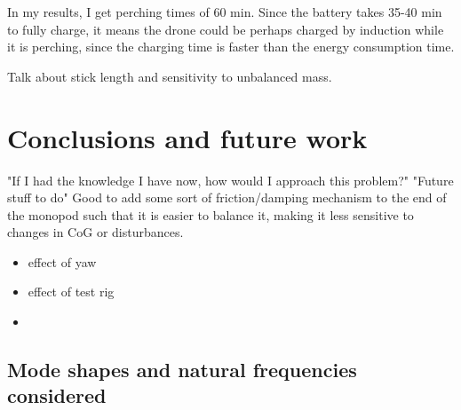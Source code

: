 \documentclass[12pt,a4paper]{article}
\begin{document}
In my results, I get perching times of 60 min. Since the battery takes 35-40 min to fully charge, it means the drone could be perhaps charged by induction while it is perching, since the charging time is faster than the energy consumption time.

Talk about stick length and sensitivity to unbalanced mass.
\section{Conclusions and future work}
"If I had the knowledge I have now, how would I approach this problem?"
"Future stuff to do"
Good to add some sort of friction/damping mechanism to the end of the monopod such that it is easier to balance it, making it less sensitive to changes in CoG or disturbances.
\begin{itemize}

\item effect of yaw
\item effect of test rig
\item   \end{itemize}





\pagebreak
\begin{appendices}
\section{Mode shapes and natural frequencies considered}

\end{appendices}
\end{document}
